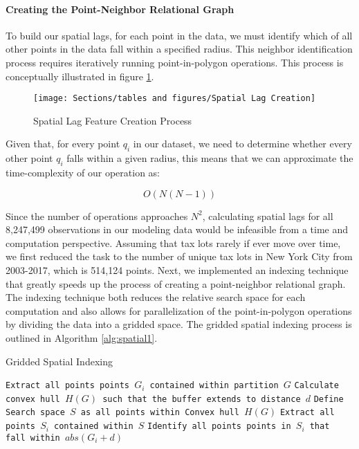\documentclass[12pt,]{article}
\let\oldparagraph\paragraph
\renewcommand{\paragraph}[1]{\oldparagraph{#1}\mbox{}}
\begin{document}
\hypertarget{creating-the-point-neighbor-relational-graph}{%
\paragraph{Creating the Point-Neighbor Relational
Graph}\label{creating-the-point-neighbor-relational-graph}}

To build our spatial lags, for each point in the data, we must identify
which of all other points in the data fall within a specified radius.
This neighbor identification process requires iteratively running
point-in-polygon operations. This process is conceptually illustrated in
figure \ref{fig:Spatial Lag Feataure Process}.

\begin{figure}[H]
\texttt{[image: Sections/tables and figures/Spatial Lag Creation]} \caption{Spatial Lag Feature Creation Process}\label{fig:Spatial Lag Feataure Process}
\end{figure}

Given that, for every point \(q_i\) in our dataset, we need to determine
whether every other point \(q_i\) falls within a given radius, this
means that we can approximate the time-complexity of our operation as:

\[
O(N(N-1))
\]

Since the number of operations approaches \(N^2\), calculating spatial
lags for all 8,247,499 observations in our modeling data would be
infeasible from a time and computation perspective. Assuming that tax
lots rarely if ever move over time, we first reduced the task to the
number of unique tax lots in New York City from 2003-2017, which is
514,124 points. Next, we implemented an indexing technique that greatly
speeds up the process of creating a point-neighbor relational graph. The
indexing technique both reduces the relative search space for each
computation and also allows for parallelization of the point-in-polygon
operations by dividing the data into a gridded space. The gridded
spatial indexing process is outlined in Algorithm \ref{alg:spatial1}.

\begin{algorithm}
  \caption{Gridded Spatial Indexing}
  \label{alg:spatial1}
  \begin{algorithmic}[1]
        \State \texttt{Extract all points points $G_i$ contained within partition $G$}
        \State \texttt{Calculate convex hull $H(G)$ such that the buffer extends to distance $d$}
        \State \texttt{Define Search space $S$ as all points within Convex hull $H(G)$}
        \State \texttt{Extract all points $S_i$ contained within $S$}
            \State \texttt{Identify all points points in $S_i$ that fall within $abs(G_i+d)$}
        \EndFor
      \EndFor
  \end{algorithmic}
\end{algorithm}
\end{document}
